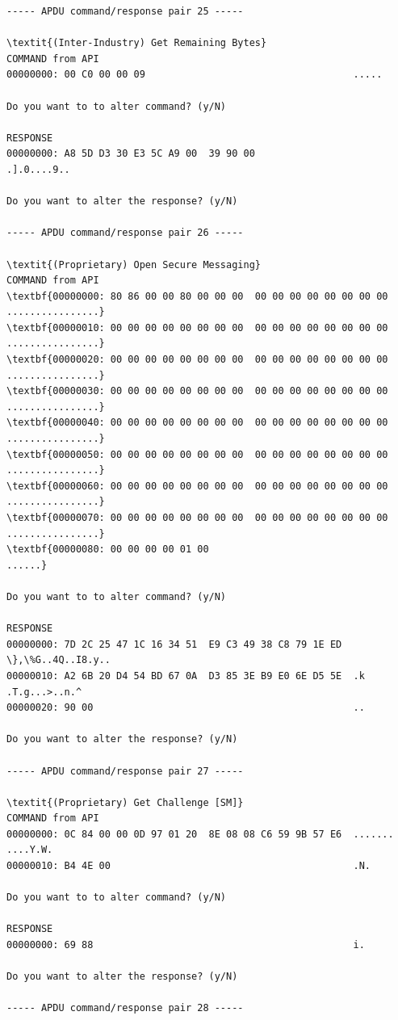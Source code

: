 \documentclass[bsc,frontabs,twoside,singlespacing,parskip,deptreport]{infthesis}     %
\begin{document}
\begin{appendices}
\begin{Verbatim}[commandchars=\\\{\}, fontsize=\small]
----- APDU command/response pair 25 -----

\textit{(Inter-Industry) Get Remaining Bytes}
COMMAND from API
00000000: 00 C0 00 00 09                                    .....

Do you want to to alter command? (y/N)

RESPONSE
00000000: A8 5D D3 30 E3 5C A9 00  39 90 00                 .].0....9..

Do you want to alter the response? (y/N)

----- APDU command/response pair 26 -----

\textit{(Proprietary) Open Secure Messaging}
COMMAND from API
\textbf{00000000: 80 86 00 00 80 00 00 00  00 00 00 00 00 00 00 00  ................}
\textbf{00000010: 00 00 00 00 00 00 00 00  00 00 00 00 00 00 00 00  ................}
\textbf{00000020: 00 00 00 00 00 00 00 00  00 00 00 00 00 00 00 00  ................}
\textbf{00000030: 00 00 00 00 00 00 00 00  00 00 00 00 00 00 00 00  ................}
\textbf{00000040: 00 00 00 00 00 00 00 00  00 00 00 00 00 00 00 00  ................}
\textbf{00000050: 00 00 00 00 00 00 00 00  00 00 00 00 00 00 00 00  ................}
\textbf{00000060: 00 00 00 00 00 00 00 00  00 00 00 00 00 00 00 00  ................}
\textbf{00000070: 00 00 00 00 00 00 00 00  00 00 00 00 00 00 00 00  ................}
\textbf{00000080: 00 00 00 00 01 00                                 ......}

Do you want to to alter command? (y/N)

RESPONSE
00000000: 7D 2C 25 47 1C 16 34 51  E9 C3 49 38 C8 79 1E ED  \},\%G..4Q..I8.y..
00000010: A2 6B 20 D4 54 BD 67 0A  D3 85 3E B9 E0 6E D5 5E  .k .T.g...>..n.^
00000020: 90 00                                             ..

Do you want to alter the response? (y/N)

----- APDU command/response pair 27 -----

\textit{(Proprietary) Get Challenge [SM]}
COMMAND from API
00000000: 0C 84 00 00 0D 97 01 20  8E 08 08 C6 59 9B 57 E6  ....... ....Y.W.
00000010: B4 4E 00                                          .N.

Do you want to to alter command? (y/N)

RESPONSE
00000000: 69 88                                             i.

Do you want to alter the response? (y/N)

----- APDU command/response pair 28 -----


\end{Verbatim}
\end{appendices}
\end{document}
